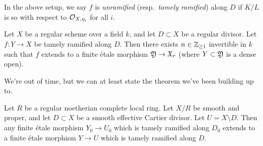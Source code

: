 \documentclass{amsart}
\begin{document}
\begin{dfn}
	In the above setup, we say $f$ is \emph{unramified} (resp.\ \emph{tamely ramified}) along $D$ if $K / L$ is so with respect to $\mathcal{O}_{X,\eta_i}$ for all $i$.
\end{dfn}

\begin{prop}
	Let $X$ be a regular scheme over a field $k$, and let $D \subset X$ be a regular divisor.
	Let $f: Y \to X$ be tamely ramified along $D$.
	Then there exists $n \in \mathbb{Z}_{\geq 1}$ invertible in $k$ such that $f$ extends to a finite \'etale morphism $\mathfrak{Y} \to \mathfrak{X}_r$ (where $Y \subset \mathfrak{Y}$ is a dense open).
\end{prop}

We're out of time, but we can at least state the theorem we've been building up to.

\begin{thm}
	Let $R$ be a regular noetherian complete local ring.
	Let $X / R$ be smooth and proper, and let $D \subset X$ be a smooth effective Cartier divisor.
	Let $U = X \setminus D$.
	Then any finite \'etale morphism $Y_0 \to U_0$ which is tamely ramified along $D_0$ extends to a finite \'etale morphism $Y \to U$ which is tamely ramified along $D$.
\end{thm}
\end{document}

